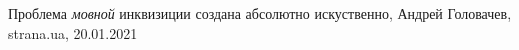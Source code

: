  
 
 
 
 
Проблема \emph{мовной} инквизиции создана абсолютно искуственно, Андрей Головачев, strana.ua, 20.01.2021
